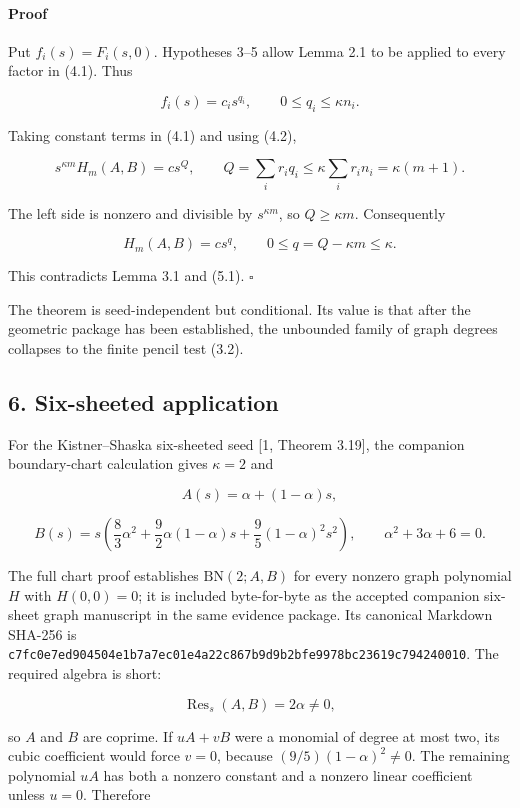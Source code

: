 \documentclass[
  11pt,
  a4paper,
]{article}
\begin{document}
\paragraph{Proof}\label{proof-2}

Put \(f_i(s)=F_i(s,0)\). Hypotheses 3--5 allow Lemma 2.1 to be applied
to every factor in (4.1). Thus

\[
f_i(s)=c_is^{q_i},
\qquad0\le q_i\le\kappa n_i.
\tag{5.2}
\]

Taking constant terms in (4.1) and using (4.2),

\[
s^{\kappa m}H_m(A,B)
=cs^Q,
\qquad
Q=\sum_i r_iq_i
\le\kappa\sum_i r_in_i
=\kappa(m+1).
\tag{5.3}
\]

The left side is nonzero and divisible by \(s^{\kappa m}\), so
\(Q\ge\kappa m\). Consequently

\[
H_m(A,B)=cs^q,
\qquad0\le q=Q-\kappa m\le\kappa.
\]

This contradicts Lemma 3.1 and (5.1). \(\square\)

The theorem is seed-independent but conditional. Its value is that after
the geometric package has been established, the unbounded family of
graph degrees collapses to the finite pencil test (3.2).

\subsection{6. Six-sheeted application}\label{six-sheeted-application}

For the Kistner--Shaska six-sheeted seed {[}1, Theorem 3.19{]}, the
companion boundary-chart calculation gives \(\kappa=2\) and

\[
A(s)=\alpha+(1-\alpha)s,
\tag{6.1}
\]

\[
B(s)=s\left(
\frac83\alpha^2+
\frac92\alpha(1-\alpha)s+
\frac95(1-\alpha)^2s^2
\right),
\qquad
\alpha^2+3\alpha+6=0.
\tag{6.2}
\]

The full chart proof establishes \(\mathrm{BN}(2;A,B)\) for every
nonzero graph polynomial \(H\) with \(H(0,0)=0\); it is included
byte-for-byte as the accepted companion six-sheet graph manuscript in
the same evidence package. Its canonical Markdown SHA-256 is
\texttt{c7fc0e7ed904504e1b7a7ec01e4a22c867b9d9b2bfe9978bc23619c794240010}.
The required algebra is short:

\[
\operatorname{Res}_s(A,B)=2\alpha\ne0,
\]

so \(A\) and \(B\) are coprime. If \(uA+vB\) were a monomial of degree
at most two, its cubic coefficient would force \(v=0\), because
\((9/5)(1-\alpha)^2\ne0\). The remaining polynomial \(uA\) has both a
nonzero constant and a nonzero linear coefficient unless \(u=0\).
Therefore
\end{document}
